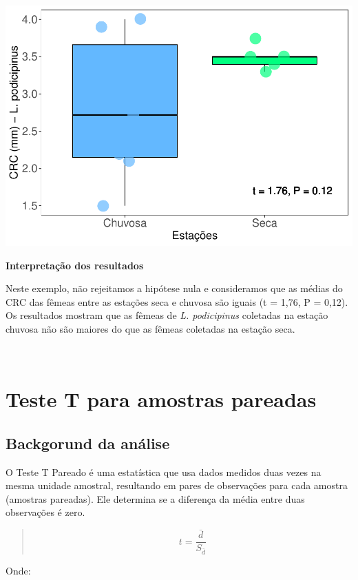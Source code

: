 \documentclass[
]{book}
\begin{document}
\includegraphics{livro_r_ecologia_files/figure-latex/unnamed-chunk-4-1.pdf}

\textbf{Interpretação dos resultados}

Neste exemplo, não rejeitamos a hipótese nula e consideramos que as médias do CRC das fêmeas entre as estações seca e chuvosa são iguais (t = 1,76, P = 0,12). Os resultados mostram que as fêmeas de \emph{L. podicipinus} coletadas na estação chuvosa não são maiores do que as fêmeas coletadas na estação seca.

~

\hypertarget{teste-t-para-amostras-pareadas}{%
\section{Teste T para amostras pareadas}\label{teste-t-para-amostras-pareadas}}

\hypertarget{backgorund-da-anuxe1lise-1}{%
\subsection{Backgorund da análise}\label{backgorund-da-anuxe1lise-1}}

O Teste T Pareado é uma estatística que usa dados medidos duas vezes na mesma unidade amostral, resultando em pares de observações para cada amostra (amostras pareadas). Ele determina se a diferença da média entre duas observações é zero.

\begin{quote}
\[ t = \frac{\bar{d}}{S_{\bar{d}}}\]
\end{quote}

Onde:
\end{document}
